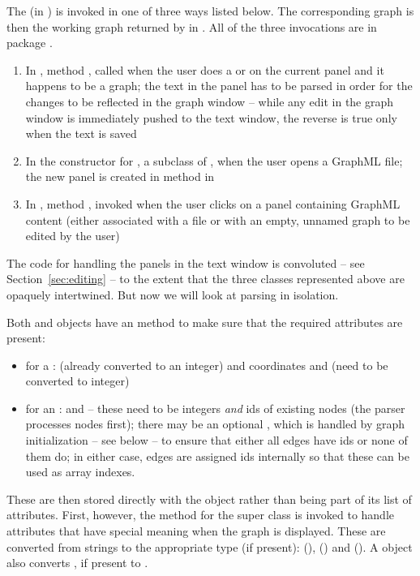 The  (in ) is invoked in one of three
ways listed below. The corresponding graph is then the working graph
returned by  in .
All of the three invocations are in package
.
\begin{enumerate}
\item In , method , called when
  the user does a  or  on the current panel and it
  happens to be a graph; the text in the panel has to be parsed in order for
  the changes to be reflected in the graph window -- while any edit in the
  graph window is immediately pushed to the text window, the reverse is true
  only when the text is saved
\item In the constructor for , a subclass of
  , when the user opens a GraphML file; the new panel is
  created in method  in 
\item In , method , invoked when the
  user clicks on a panel containing GraphML content (either associated with a file or with an empty, unnamed graph to
  be edited by the user)
\end{enumerate}
The code for handling the panels in the text window is convoluted -- see
Section~\ref{sec:editing} -- to the extent that the three classes represented
above are opaquely intertwined. But now we will look at parsing in isolation.

Both  and  objects have an
 method to make sure that the required
attributes are present:
\begin{itemize}
  \item for a :  (already converted to an integer) and
    coordinates  and  (need to be converted to integer)
  \item for an :  and  -- these need to
    be integers \emph{and} ids of existing nodes (the parser processes nodes
    first); there may be an optional , which is handled by graph
    initialization -- see below -- to ensure that either all edges have ids
    or none of them do; in either case, edges are assigned ids internally so
    that these can be used as array indexes.
\end{itemize}
These are then stored directly with the object rather
than being part of its list of attributes.  First, however, the
 method for the super class
 is invoked to handle attributes that have special meaning
when the graph is displayed. These are converted from strings to the
appropriate type (if present):  (), 
() and  (). A  object
also converts , if present to .

